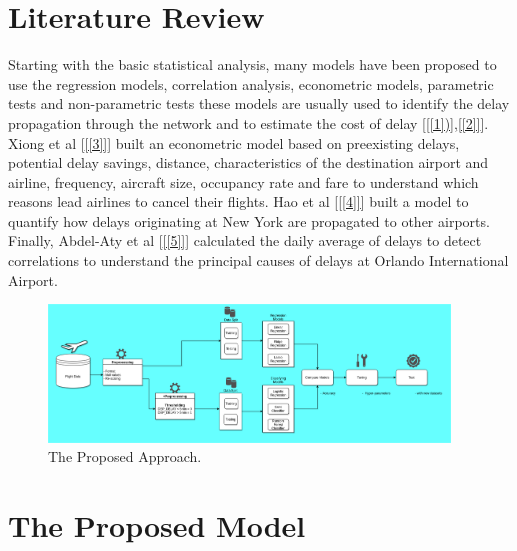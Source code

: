 \documentclass[conference]{IEEEtran}
\begin{document}

\section{Literature Review}\label{Section II}

Starting with the basic statistical analysis, many models have been proposed to use the regression models, correlation analysis, econometric models, parametric tests and non-parametric tests these models are usually used to identify the delay propagation through the network and to estimate the cost of delay [\ref{[1])},\ref{[2]}]. Xiong et al [\ref{[3]}] built an econometric model based on preexisting delays, potential delay savings, distance, characteristics of the destination airport and airline, frequency, aircraft size, occupancy rate and fare to understand which reasons lead airlines to cancel their flights. Hao et al [\ref{[4]}] built a model to quantify how delays originating at New York are propagated to other airports. Finally, Abdel-Aty et al [\ref{[5]}] calculated the daily average of delays to detect correlations to understand the principal causes of delays at Orlando International Airport.


\begin{figure} [!t]
\centering
\includegraphics[clip, width=0.95\textwidth]{blockDiagram.png}
\caption{The Proposed Approach.}
\label{fig:app}
\end{figure} 


\section{The Proposed Model}\label{Section III}
\end{document}
